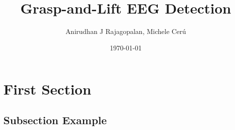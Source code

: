 \documentclass{beamer}
\title[GAL prediction]{Grasp-and-Lift EEG Detection } %
\author{Anirudhan J Rajagopalan, Michele Cer\'u} %
\institute[UCLA] %
{
New York University \\ %
\medskip
\textit{ajr619@nyu.edu; mc3784@nyu.edu} %
}
\date{\today} %
\begin{document}
\begin{frame}
\titlepage %
\end{frame}





\section{First Section} %

\subsection{Subsection Example} %
\end{document}
